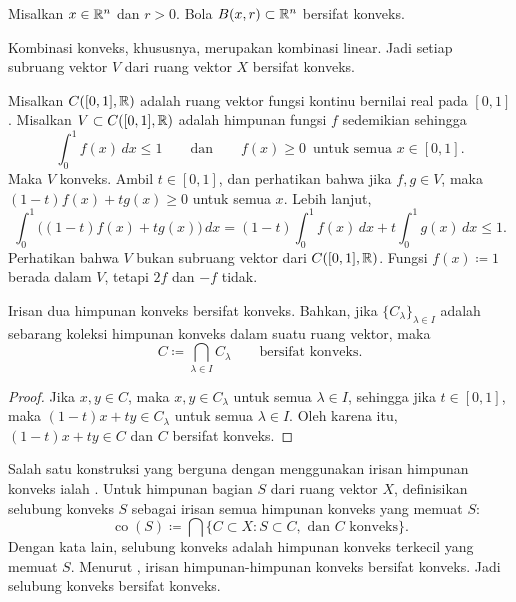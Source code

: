 \begin{prop}
Misalkan $x \in {\mathbb{R}}^n$ dan $r > 0$.  Bola $B(x,r) \subset {\mathbb{R}}^n$
bersifat konveks.
\end{prop}

\begin{example}
Kombinasi konveks, khususnya, merupakan kombinasi linear.
Jadi setiap subruang vektor $V$ dari ruang vektor $X$ bersifat konveks.
\end{example}

\begin{example}
Misalkan $C([0,1],{\mathbb{R}})$ adalah ruang vektor fungsi kontinu bernilai real pada $[0,1]$.
Misalkan $V \subset C([0,1],{\mathbb{R}})$ adalah himpunan fungsi $f$ sedemikian sehingga
\begin{equation*}
\int_0^1 f(x)\,dx \leq 1 \qquad \text{dan} \qquad
f(x) \geq 0 \enspace \text{untuk semua } x \in [0,1] .
\end{equation*}
Maka $V$ konveks.  Ambil $t \in [0,1]$, dan perhatikan bahwa jika $f,g \in V$,
maka $(1-t) f(x) + t g(x) \geq 0$ untuk semua $x$.  Lebih lanjut,
\begin{equation*}
\int_0^1 \bigl((1-t)f(x) + t g(x)\bigr) \,dx
=
(1-t) \int_0^1 f(x) \,dx
+ t \int_0^1 g(x) \,dx \leq 1 .
\end{equation*}
Perhatikan bahwa $V$ bukan subruang vektor dari $C([0,1],{\mathbb{R}})$.  Fungsi
$f(x) \coloneqq 1$ berada dalam $V$, tetapi $2f$ dan $-f$ tidak.
\end{example}

\begin{prop} \label{prop:intersectionconvex}
Irisan dua himpunan konveks bersifat konveks.  Bahkan,
jika $\{ C_\lambda \}_{\lambda \in I}$ adalah
sebarang koleksi himpunan konveks dalam suatu ruang vektor, maka
\begin{equation*}
C \coloneqq \bigcap_{\lambda \in I} C_\lambda
\qquad \text{bersifat konveks.}
\end{equation*}
\end{prop}

\begin{proof}
Jika $x, y \in C$, maka $x,y \in C_\lambda$ untuk semua
$\lambda \in I$, sehingga jika $t \in [0,1]$, maka $(1-t)x + ty \in
C_\lambda$ untuk semua $\lambda \in I$.  Oleh karena itu, $(1-t)x + ty \in C$ dan $C$
bersifat konveks.
\end{proof}

Salah satu konstruksi yang berguna dengan menggunakan irisan himpunan konveks ialah
\emph{}.  Untuk himpunan bagian $S$ dari ruang
vektor $X$, definisikan selubung konveks $S$ sebagai irisan semua himpunan konveks
yang memuat $S$:
\begin{equation*}
\operatorname{co}(S) \coloneqq
\bigcap \{ C \subset X : S \subset C, \text{ dan } C \text{ konveks} \} .
\end{equation*}
Dengan kata lain, selubung konveks adalah himpunan konveks terkecil yang memuat $S$.
Menurut , irisan himpunan-himpunan konveks
bersifat konveks.
Jadi selubung konveks bersifat konveks.

